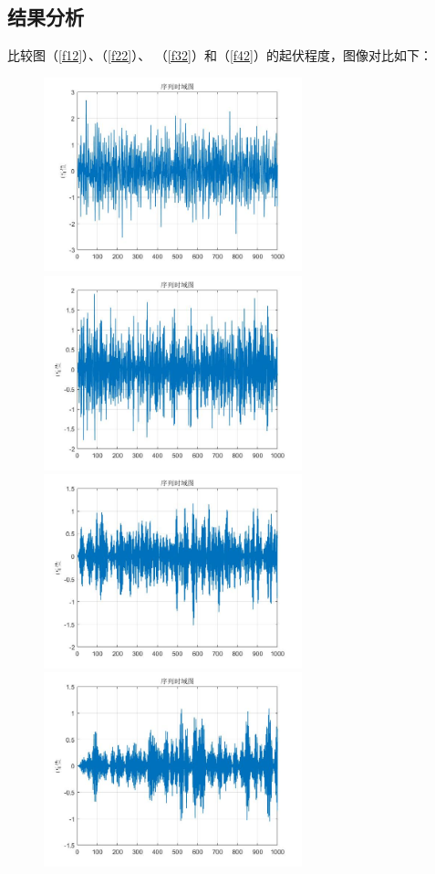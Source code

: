 \documentclass[UTF-8, a4paper, 12pt]{ctexart}
\begin{document}
\subsection{结果分析}
比较图（\ref{f12}）、（\ref{f22}）、
（\ref{f32}）和（\ref{f42}）的起伏程度，图像对比如下：
\begin{figure}[htbp]
    \centering
    \includegraphics[width=7.5cm]{figs/f1-2.jpg}
    \includegraphics[width=7.5cm]{figs/f22.jpg}
    \includegraphics[width=7.5cm]{figs/f32.jpg}
    \includegraphics[width=7.5cm]{figs/f42.jpg}
\end{figure}
\end{document}
